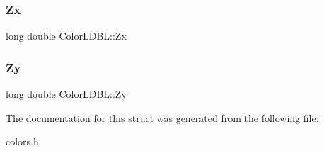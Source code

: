 \subsubsection{\texorpdfstring{Zx}{Zx}}
{\footnotesize\ttfamily long double Color\+L\+D\+B\+L\+::\+Zx}

\mbox{\label{struct_color_l_d_b_l_a51a0c2cb239dcadc284963eb8a5ba423}} 
\subsubsection{\texorpdfstring{Zy}{Zy}}
{\footnotesize\ttfamily long double Color\+L\+D\+B\+L\+::\+Zy}



The documentation for this struct was generated from the following file\+:\begin{DoxyCompactItemize}
\item 
colors.\+h\end{DoxyCompactItemize}
